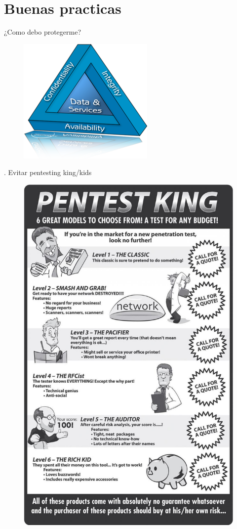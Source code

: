 \documentclass[12pt]{beamer}
\begin{document}
\section{Buenas practicas}

\begin{frame}
\LARGE \centering ¿Como debo protegerme?
\end{frame}

\begin{frame}
\begin{figure}
\centering
\includegraphics[width=0.5\linewidth]{Images/ciatriad}
\end{figure}
\end{frame}


\begin{frame}
\LARGE {}. Evitar pentesting king/kids
\end{frame}

\begin{frame}
\begin{figure}
\centering
\includegraphics[width=0.6\linewidth]{Images/pentestingkings}
\end{figure}
\end{frame}
\end{document}
